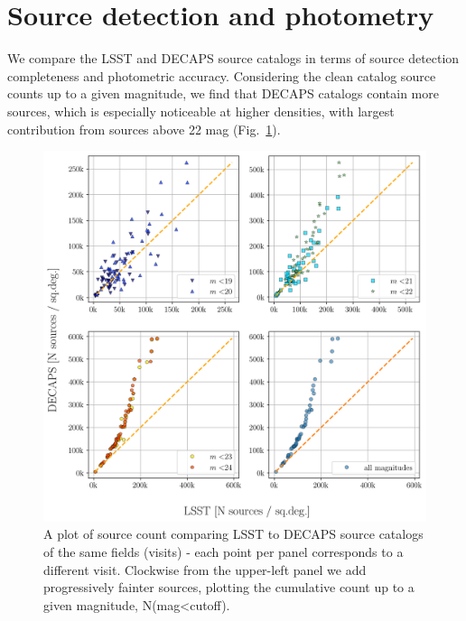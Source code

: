 \documentclass[DM,lsstdraft,toc,usenatbib,authoryear]{lsstdoc}
\begin{document}

\section{Source detection and photometry}
\label{sec:metrics}

We compare the LSST and DECAPS source catalogs in terms of source detection completeness and photometric accuracy. Considering the clean catalog source counts up to a given magnitude, we find that DECAPS catalogs contain more sources, which is especially noticeable at higher densities, with largest contribution from sources above 22 mag (Fig.~\ref{fig:lsst_count_comparison}).


\begin{figure}
\begin{centering}
\includegraphics[width=0.9\columnwidth]{figs/decaps_lsst_source_count.png}
\caption{A plot of source count comparing LSST to DECAPS source catalogs of the same fields (visits) -  each point per panel corresponds to a different visit. Clockwise from the upper-left panel we add progressively fainter sources, plotting the cumulative count up to a given magnitude, N(mag<cutoff).}
\label{fig:lsst_count_comparison}
\end{centering}
\end{figure}
\end{document}
